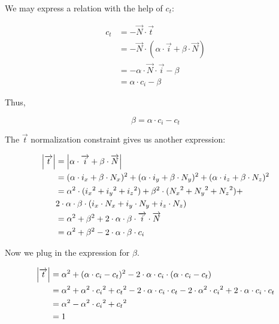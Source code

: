 We may express a relation with the help of $c_t$:

\begin{equation} \begin{split}
c_t &= - \overrightarrow{N} \cdot \overrightarrow{t} \\
&= - \overrightarrow{N} \cdot
   (\alpha \cdot \overrightarrow{i} + \beta \cdot \overrightarrow{N}) \\
&= - \alpha \cdot \overrightarrow{N} \cdot \overrightarrow{i} - \beta \\
&= \alpha \cdot c_i - \beta
\end{split} \end{equation}

Thus,

\begin{equation}
\beta = \alpha \cdot c_i - c_t
\end{equation}

The $\overrightarrow{t}$ normalization constraint gives us another expression:

\begin{equation} \begin{split}
\abs{\overrightarrow{t}} &= \abs{\alpha \cdot \overrightarrow{i}
                                 + \beta \cdot \overrightarrow{N}} \\
&= (\alpha \cdot i_x + \beta \cdot N_x)^2 +
   (\alpha \cdot i_y + \beta \cdot N_y)^2 +
   (\alpha \cdot i_z + \beta \cdot N_z)^2 \\
&= \alpha^2 \cdot ({i_x}^2 + {i_y}^2 + {i_z}^2) +
   \beta^2 \cdot ({N_x}^2 + {N_y}^2 + {N_z}^2) + \\
   & 2 \cdot \alpha \cdot \beta \cdot
     (i_x \cdot N_x + i_y \cdot N_y + i_z \cdot N_z) \\
&= \alpha^2 + \beta^2 + 2 \cdot \alpha \cdot \beta \cdot \overrightarrow{i}
   \cdot \overrightarrow{N} \\
&= \alpha^2 + \beta^2 - 2 \cdot \alpha \cdot \beta \cdot c_i
\end{split} \end{equation}

Now we plug in the expression for $\beta$.

\begin{equation} \begin{split}
\abs{\overrightarrow{t}} &=
\alpha^2 + (\alpha \cdot c_i - c_t)^2 - 2 \cdot \alpha \cdot c_i \cdot
(\alpha \cdot c_i - c_t) \\
&= \alpha^2 + \alpha^2 \cdot {c_i}^2 + {c_t}^2
- 2 \cdot \alpha \cdot c_i \cdot c_t - 2 \cdot \alpha^2 \cdot {c_i}^2
+ 2 \cdot \alpha \cdot c_i \cdot c_t \\
&= \alpha^2 - \alpha^2 \cdot {c_i}^2 + {c_t}^2 \\
&= 1
\end{split} \end{equation}


